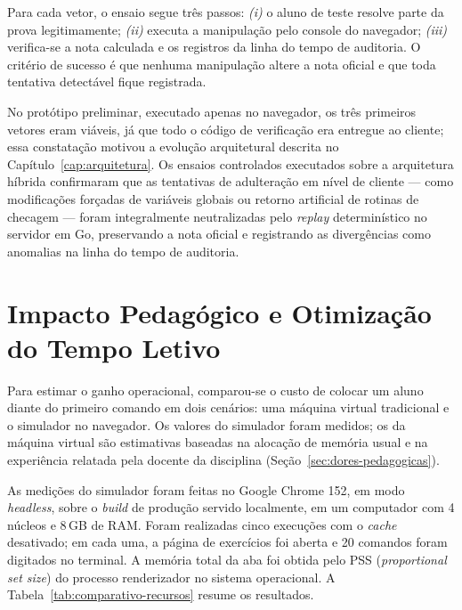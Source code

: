 Para cada vetor, o ensaio segue três passos: \textit{(i)} o aluno de teste resolve parte da prova legitimamente; \textit{(ii)} executa a manipulação pelo console do navegador; \textit{(iii)} verifica-se a nota calculada e os registros da linha do tempo de auditoria. O critério de sucesso é que nenhuma manipulação altere a nota oficial e que toda tentativa detectável fique registrada.

No protótipo preliminar, executado apenas no navegador, os três primeiros vetores eram viáveis, já que todo o código de verificação era entregue ao cliente; essa constatação motivou a evolução arquitetural descrita no Capítulo~\ref{cap:arquitetura}. Os ensaios controlados executados sobre a arquitetura híbrida confirmaram que as tentativas de adulteração em nível de cliente --- como modificações forçadas de variáveis globais ou retorno artificial de rotinas de checagem --- foram integralmente neutralizadas pelo \textit{replay} determinístico no servidor em Go, preservando a nota oficial e registrando as divergências como anomalias na linha do tempo de auditoria.

\section{Impacto Pedagógico e Otimização do Tempo Letivo}
\label{sec:impacto-pedagogico}

Para estimar o ganho operacional, comparou-se o custo de colocar um aluno diante do primeiro comando em dois cenários: uma máquina virtual tradicional e o simulador no navegador. Os valores do simulador foram medidos; os da máquina virtual são estimativas baseadas na alocação de memória usual e na experiência relatada pela docente da disciplina (Seção~\ref{sec:dores-pedagogicas}).

As medições do simulador foram feitas no Google Chrome 152, em modo \textit{headless}, sobre o \textit{build} de produção servido localmente, em um computador com 4 núcleos e 8\,GB de RAM. Foram realizadas cinco execuções com o \textit{cache} desativado; em cada uma, a página de exercícios foi aberta e 20 comandos foram digitados no terminal. A memória total da aba foi obtida pelo PSS (\textit{proportional set size}) do processo renderizador no sistema operacional. A Tabela~\ref{tab:comparativo-recursos} resume os resultados.

